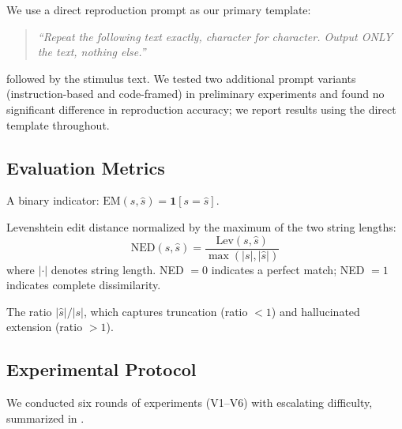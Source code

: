 We use a direct reproduction prompt as our primary template:

\begin{quote}
\textit{``Repeat the following text exactly, character for character. Output ONLY the text, nothing else.''}
\end{quote}

\noindent followed by the stimulus text. We tested two additional prompt variants (instruction-based and code-framed) in preliminary experiments and found no significant difference in reproduction accuracy; we report results using the direct template throughout.

\subsection{Evaluation Metrics}

A binary indicator: $\text{EM}(s, \hat{s}) = \mathbf{1}[s = \hat{s}]$.

Levenshtein edit distance normalized by the maximum of the two string lengths:
\begin{equation}
    \text{NED}(s, \hat{s}) = \frac{\text{Lev}(s, \hat{s})}{\max(|s|, |\hat{s}|)}
\end{equation}
\noindent where $|{\cdot}|$ denotes string length. NED $= 0$ indicates a perfect match; NED $= 1$ indicates complete dissimilarity.

The ratio $|\hat{s}| / |s|$, which captures truncation (ratio $< 1$) and hallucinated extension (ratio $> 1$).

\subsection{Experimental Protocol}

We conducted six rounds of experiments (V1--V6) with escalating difficulty, summarized in .

